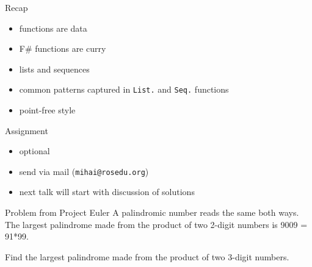 \documentclass{beamer}
\begin{document}
\begin{frame}{Recap}
  \begin{itemize}[<+->]
    \item functions are data
    \item F\# functions are curry
    \item lists and sequences
    \item common patterns captured in \texttt{List.} and \texttt{Seq.}
    functions
    \item point-free style
  \end{itemize}
\end{frame}

\begin{frame}[fragile]{Assignment}
  \begin{itemize}
    \item optional
    \item send via mail (\texttt{mihai@rosedu.org})
    \item next talk will start with discussion of solutions
  \end{itemize}
  \pause
  \begin{block}{Problem from Project Euler}
  A palindromic number reads the same both ways. The largest palindrome made
  from the product of two 2-digit numbers is 9009 = 91*99.

  Find the largest palindrome made from the product of two 3-digit numbers.
  \end{block}
\end{frame}
\end{document}
